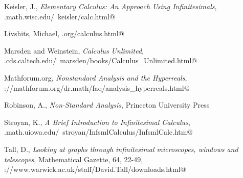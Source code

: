 Keisler, J., \emph{Elementary Calculus: An Approach Using Infinitesimals}, \verb@www.math.wisc.edu/~keisler/calc.html@

Livshits, Michael, \verb@mathfoolery.org/calculus.html@

Marsden and Weinstein, \emph{Calculus Unlimited}, \verb@www.cds.caltech.edu/~marsden/books/Calculus_Unlimited.html@

Mathforum.org, \emph{Nonstandard Analysis and the Hyperreals}, \verb@http://mathforum.org/dr.math/faq/analysis_hyperreals.html@

Robinson, A., \emph{Non-Standard Analysis}, Princeton University Press

Stroyan, K., \emph{A Brief Introduction to Infinitesimal Calculus}, \verb@www.math.uiowa.edu/~stroyan/InfsmlCalculus/InfsmlCalc.htm@

Tall, D., \emph{Looking at graphs through infinitesimal microscopes, windows and telescopes}, Mathematical Gazette, 64, 22-49, 
\verb@http://www.warwick.ac.uk/staff/David.Tall/downloads.html@
